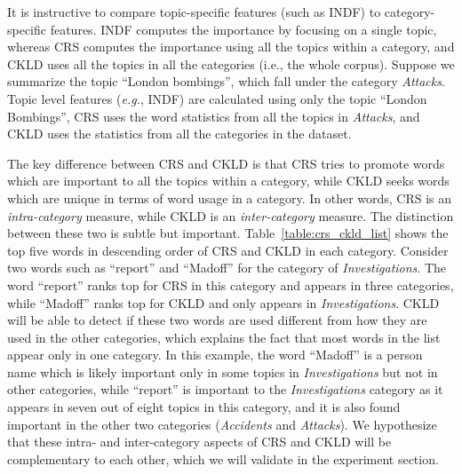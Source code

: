 It is instructive to compare topic-specific features (such as INDF) to category-specific features.
INDF computes the importance by focusing on a single topic, whereas CRS computes the importance using all the topics within a category, and CKLD uses all the topics in all the categories (i.e., the whole corpus).
Suppose we summarize the topic ``London bombings'', which fall under the category \emph{Attacks}. Topic level features ({\it e.g.}, INDF) are calculated using only the topic ``London Bombings'', CRS uses the word statistics from all the topics in \emph{Attacks}, and CKLD uses the statistics from all the categories in the dataset.

The key difference between CRS and CKLD is that CRS tries to promote words which are important to all the topics within a category, while CKLD seeks words which are unique in terms of word usage in a category. In other words, CRS is an {\it intra-category} measure, while CKLD is an {\it inter-category} measure.
The distinction between these two is subtle but important. 
Table~\ref{table:crs_ckld_list} shows the top five words in descending order of CRS and CKLD in each category.
Consider two words such as ``report'' and ``Madoff'' for the category of \emph{Investigations}. 
The word ``report'' ranks top for CRS in this category and appears in three categories, while ``Madoff'' ranks top for CKLD and only appears in \emph{Investigations}.
CKLD will be able to detect if these two words are used different from how they are used in the other categories, which explains the fact that most words in the list appear only in one category. 
In this example, the word ``Madoff'' is a person name which is likely important only in some topics in \emph{Investigations} but not in other categories, while ``report'' is important to the \emph{Investigations} category as it appears in seven out of eight topics in this category, and it is also found important in the other two categories (\emph{Accidents} and \emph{Attacks}).
We hypothesize that these intra- and inter-category aspects of CRS and CKLD will be complementary to each other, which we will validate in the experiment section.


